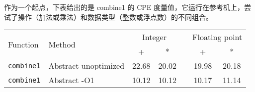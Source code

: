 作为一个起点，下表给出的是 combine1 的 CPE 度量值，它运行在参考机上，尝试了操作（加法或乘法）和数据类型（整数或浮点数）的不同组合。

\begin{table}[!ht]
    \centering
    \begin{tabular}{llccccc}
        \toprule
         \multirow{2}{*}{Function} & \multirow{2}{*}{Method} & \multicolumn{2}{c}{Integer} & & \multicolumn{2}{c}{Floating point} \\
         \cmidrule{3-4}
         \cmidrule{6-7}
          & & + & * & & + & * \\
         \midrule
         \texttt{combine1} & Abstract unoptimized & 22.68 & 20.02 & & 19.98 & 20.18 \\
         \texttt{combine1} & Abstract -O1 & 10.12 & 10.12 & & 10.17 & 11.14 \\
         \bottomrule
    \end{tabular}
\end{table}
